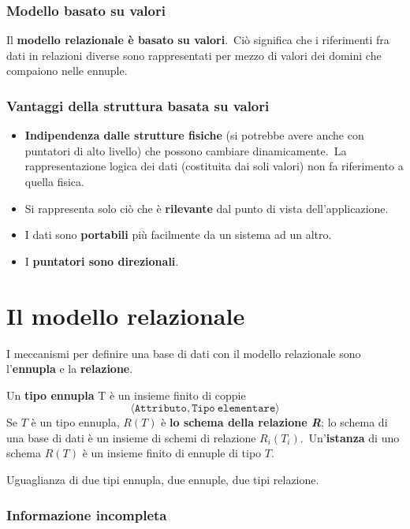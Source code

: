 \subsubsection{Modello basato su valori}

Il \textbf{modello relazionale è basato su valori}.\
Ciò significa che i riferimenti fra dati in relazioni diverse sono rappresentati per mezzo di valori dei domini che compaiono nelle ennuple.

\subsubsection{Vantaggi della struttura basata su valori}
\begin{itemize}
	\item \textbf{Indipendenza dalle strutture fisiche} (si potrebbe avere anche con puntatori di alto livello) che possono cambiare dinamicamente.\ La rappresentazione logica dei dati (costituita dai soli valori) non fa riferimento a quella fisica.
	\item Si rappresenta solo ciò che è \textbf{rilevante} dal punto di vista dell'applicazione.
	\item I dati sono \textbf{portabili} più facilmente da un sistema ad un altro.
	\item I \textbf{puntatori sono direzionali}.
\end{itemize}

\section{Il modello relazionale}

\begin{definition}
	I meccanismi per definire una base di dati con il modello relazionale sono l'\textbf{ennupla} e la \textbf{relazione}.\
\end{definition}

\noindent Un \textbf{tipo ennupla} T è un insieme finito di coppie \[\langle\mathtt{Attributo, Tipo\ elementare}\rangle\]
Se $T$ è un tipo ennupla, $R(T)$ è \textbf{lo schema della relazione \textit{R}}; lo schema di una base di dati è un insieme di schemi di relazione $R_i(T_i)$.\
Un'\textbf{istanza} di uno schema $R(T)$ è un insieme finito di ennuple di tipo $T$.

Uguaglianza di due tipi ennupla, due ennuple, due tipi relazione.

\subsubsection{Informazione incompleta}

